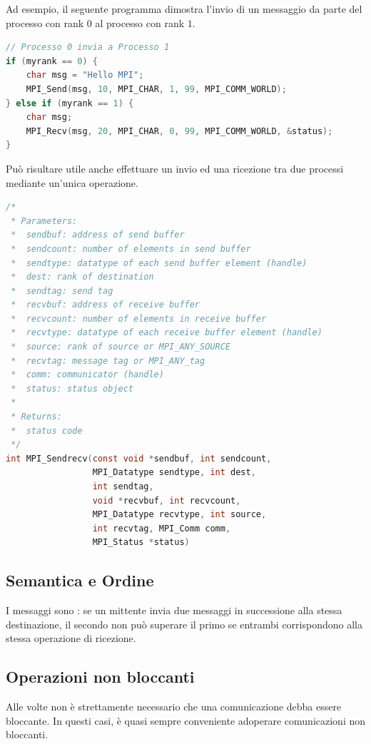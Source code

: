 Ad esempio, il seguente programma dimostra l'invio di un messaggio da parte del processo con rank \(0\) al processo con rank \(1\).
\begin{lstlisting}[language=C, numbers=none]
// Processo 0 invia a Processo 1
if (myrank == 0) {
    char msg = "Hello MPI";
    MPI_Send(msg, 10, MPI_CHAR, 1, 99, MPI_COMM_WORLD);
} else if (myrank == 1) {
    char msg;
    MPI_Recv(msg, 20, MPI_CHAR, 0, 99, MPI_COMM_WORLD, &status);
}
\end{lstlisting}

Può risultare utile anche effettuare un invio ed una ricezione tra due processi mediante un'unica operazione.

\begin{lstlisting}[language=C, numbers=none]
/*
 * Parameters:
 *  sendbuf: address of send buffer
 *  sendcount: number of elements in send buffer
 *  sendtype: datatype of each send buffer element (handle)
 *  dest: rank of destination
 *  sendtag: send tag
 *  recvbuf: address of receive buffer
 *  recvcount: number of elements in receive buffer
 *  recvtype: datatype of each receive buffer element (handle)
 *  source: rank of source or MPI_ANY_SOURCE
 *  recvtag: message tag or MPI_ANY_tag
 *  comm: communicator (handle)
 *  status: status object
 * 
 * Returns:
 *  status code
 */
int MPI_Sendrecv(const void *sendbuf, int sendcount,
                 MPI_Datatype sendtype, int dest,
                 int sendtag,
                 void *recvbuf, int recvcount,
                 MPI_Datatype recvtype, int source,
                 int recvtag, MPI_Comm comm,
                 MPI_Status *status)
\end{lstlisting}

\subsection{Semantica e Ordine}
I messaggi sono : se un mittente invia due messaggi in successione alla stessa destinazione, il secondo non può superare il primo se entrambi corrispondono alla stessa operazione di ricezione.

\subsection{Operazioni non bloccanti}
Alle volte non è strettamente necessario che una comunicazione debba essere bloccante.
In questi casi, è quasi sempre conveniente adoperare comunicazioni non bloccanti.

